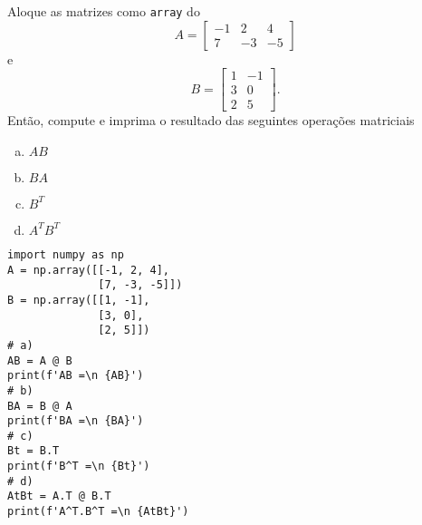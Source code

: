 \begin{exer}
  Aloque as matrizes como \lstinline+array+ do {\numpy}
  \begin{equation}
    A =
    \begin{bmatrix}
        -1 & 2 & 4\\
        7 & -3 & -5
      \end{bmatrix}      
  \end{equation}
  e
  \begin{equation}
    B =
    \begin{bmatrix}
        1 & -1\\
        3 & 0\\
        2 & 5
      \end{bmatrix}.      
  \end{equation}
  Então, compute e imprima o resultado das seguintes operações matriciais
  \begin{enumerate}[a)]
  \item $AB$
  \item $BA$
  \item $B^T$
  \item $A^TB^T$
  \end{enumerate}
\end{exer}
\begin{resp}
\begin{lstlisting}
import numpy as np
A = np.array([[-1, 2, 4],
              [7, -3, -5]])
B = np.array([[1, -1],
              [3, 0],
              [2, 5]])
# a)
AB = A @ B
print(f'AB =\n {AB}')
# b)
BA = B @ A
print(f'BA =\n {BA}')
# c)
Bt = B.T
print(f'B^T =\n {Bt}')
# d)
AtBt = A.T @ B.T
print(f'A^T.B^T =\n {AtBt}')
\end{lstlisting}
\end{resp}

